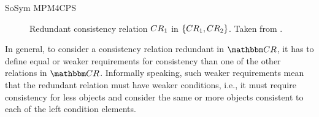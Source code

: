 \begin{copiedFrom}{SoSym MPM4CPS}


\begin{figure}
    \centering
    
    \caption{Redundant consistency relation $CR_{1}$ in $\{ CR_{1}, CR_{2} \}$. Taken from .}
    \label{fig:correctness:formal:redundancyrelationextremes}
\end{figure}

In general, to consider a consistency relation redundant in %
$\consistencyrelationset{CR}$, it has to define equal or weaker requirements for consistency than one of the other relations in $\consistencyrelationset{CR}$.
Informally speaking, such weaker requirements mean that the redundant relation must have weaker conditions, i.e., it must require consistency for less objects and consider the same or more objects consistent to each of the left condition elements. %


\end{copiedFrom}
